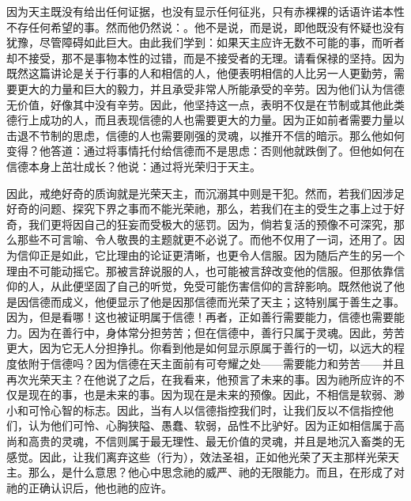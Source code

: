 \par

因为天主既没有给出任何证据，也没有显示任何征兆，只有赤裸裸的话语许诺本性不存任何希望的事。然而他仍然说：。他不是说，而是说，即他既没有怀疑也没有犹豫，尽管障碍如此巨大。由此我们学到：如果天主应许无数不可能的事，而听者却不接受，那不是事物本性的过错，而是不接受者的无理。请看保禄的坚持。因为既然这篇讲论是关于行事的人和相信的人，他便表明相信的人比另一人更勤劳，需要更大的力量和巨大的毅力，并且承受非常人所能承受的辛劳。因为他们认为信德无价值，好像其中没有辛劳。因此，他坚持这一点，表明不仅是在节制或其他此类德行上成功的人，而且表现信德的人也需要更大的力量。因为正如前者需要力量以击退不节制的思虑，信德的人也需要刚强的灵魂，以推开不信的暗示。那么他如何变得？他答道：通过将事情托付给信德而不是思虑：否则他就跌倒了。但他如何在信德本身上茁壮成长？他说：通过将光荣归于天主。\par

\par

因此，戒绝好奇的质询就是光荣天主，而沉溺其中则是干犯。然而，若我们因涉足好奇的问题、探究下界之事而不能光荣祂，那么，若我们在主的受生之事上过于好奇，我们更将因自己的狂妄而受极大的惩罚。因为，倘若复活的预像不可深究，那么那些不可言喻、令人敬畏的主题就更不必说了。而他不仅用了一词，还用了。因为信仰正是如此，它比理由的论证更清晰，也更令人信服。因为随后产生的另一个理由不可能动摇它。那被言辞说服的人，也可能被言辞改变他的信服。但那依靠信仰的人，从此便坚固了自己的听觉，免受可能伤害信仰的言辞影响。既然他说了他是因信德而成义，他便显示了他是因那信德而光荣了天主；这特别属于善生之事。因为，但是看哪！这也被证明属于信德！再者，正如善行需要能力，信德也需要能力。因为在善行中，身体常分担劳苦；但在信德中，善行只属于灵魂。因此，劳苦更大，因为它无人分担挣扎。你看到他是如何显示原属于善行的一切，以远大的程度依附于信德吗？因为信德在天主面前有可夸耀之处——需要能力和劳苦——并且再次光荣天主？在他说了之后，在我看来，他预言了未来的事。因为祂所应许的不仅是现在的事，也是未来的事。因为现在是未来的预像。因此，不相信是软弱、渺小和可怜心智的标志。因此，当有人以信德指控我们时，让我们反以不信指控他们，认为他们可怜、心胸狭隘、愚蠢、软弱，品性不比驴好。因为正如相信属于高尚和高贵的灵魂，不信则属于最无理性、最无价值的灵魂，并且是地沉入畜类的无感觉。因此，让我们离弃这些（行为），效法圣祖，正如他光荣了天主那样光荣天主。那么，是什么意思？他心中思念祂的威严、祂的无限能力。而且，在形成了对祂的正确认识后，他也祂的应许。\par

